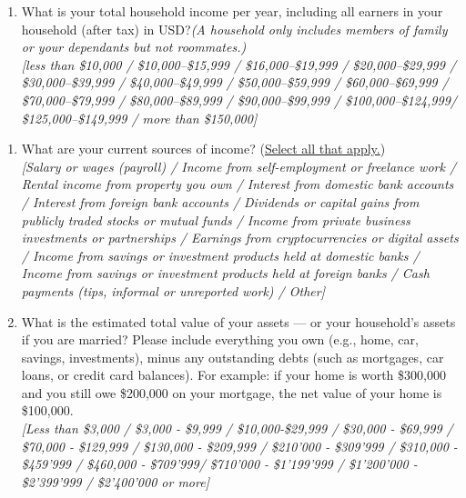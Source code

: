 \documentclass[11pt]{article}
\begin{document}
\begin{enumerate}
    \textit{[Yes / No]}
\item What is your total household income per year, including all earners in your household (after tax) in USD?\textit{(A household only includes members of family or your dependants but not roommates.)} \\
    \textit{[less than \$10,000 / \$10,000--\$15,999 / \$16,000--\$19,999 / \$20,000--\$29,999 / \$30,000--\$39,999 / \$40,000--\$49,999 / \$50,000--\$59,999 / \$60,000--\$69,999 / \$70,000--\$79,999 / \$80,000--\$89,999 / \$90,000--\$99,999 / \$100,000--\$124,999/ \$125,000--\$149,999 / more than \$150,000]}

\end{enumerate}
\begin{enumerate}[resume]
    \item  What are your current sources of income? (\uline{Select all that apply.})\\
    \textit{[Salary or wages (payroll) / Income from self-employment or freelance work / Rental income from property you own / Interest from domestic bank accounts / Interest from foreign bank accounts / Dividends or capital gains from publicly traded stocks or mutual funds / Income from private business investments or partnerships / Earnings from cryptocurrencies or digital assets / Income from savings or investment products held at domestic banks / Income from savings or investment products held at foreign banks / Cash payments (tips, informal or unreported work) / Other]}
    \item What is the estimated total value of your assets — or your household’s assets if you are married? Please include everything you own (e.g., home, car, savings, investments), minus any outstanding debts (such as mortgages, car loans, or credit card balances). For example: if your home is worth \$300,000 and you still owe \$200,000 on your mortgage, the net value of your home is \$100,000.\\
    \textit{[Less than \$3,000 / \$3,000 - \$9,999 / \$10,000-\$29,999 / 
    \$30,000 - \$69,999 / \$70,000 - \$129,999 / \$130,000 - \$209,999 / 
    \$210'000 - \$309'999 / \$310,000 - \$459'999 / \$460,000 - \$709'999/
    \$710'000 - \$1'199'999 / \$1'200'000 - \$2'399'999 / \$2'400'000 or more]}
\end{enumerate}
\end{document}
